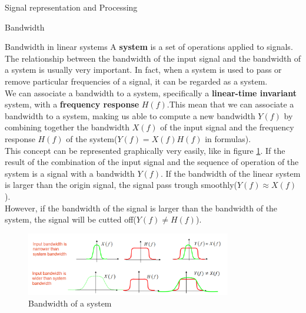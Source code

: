 \begin{section}{Signal representation and Processing}
\begin{subsection}{Bandwidth}
    \begin{subsubsection}{Bandwidth in linear systems}
      A \textbf{system} is a set of operations applied to signals.\\
      The relationship between the bandwidth of the input signal and the bandwidth of a system is
      usually very important. In fact, when a system is used to pass or remove particular 
      frequencies of a signal, it can be regarded as a system.\\
      We can associate a bandwidth to a system, specifically a \textbf{linear-time invariant} system,
      with a \textbf{frequency response} $H(f)$.This mean that we can associate a bandwidth to a
      system, making us able to compute a new bandwidth $Y(f)$ by combining together the bandwidth 
      $X(f)$ of the input signal and the frequency response $H(f)$ of the system($Y(f) = X(f)H(f)$
      in formulas).\\
      This concept can be represented graphically very easily, like in figure 
      \ref{fig:Bandwidth System}. If the result of the combination of the input signal and the
      sequence of operation of the system is a signal with a bandwidth $Y(f)$. If the bandwidth of 
      the linear system is larger than the origin signal, the signal pass trough smoothly($Y(f) \approx X(f)$).\\
      However, if the bandwidth of the signal is larger than the bandwidth of the system, the signal
      will be cutted off($Y(f) \ne H(f)$).\\

      \begin{figure}[h]
        \centering
        \includegraphics[width=0.8\textwidth]{img/wireless/bandwidth system.png}
        \caption{Bandwidth of a system}
        \label{fig:Bandwidth System}
      \end{figure}
    \end{subsubsection}
  \end{subsection}


\end{section}
